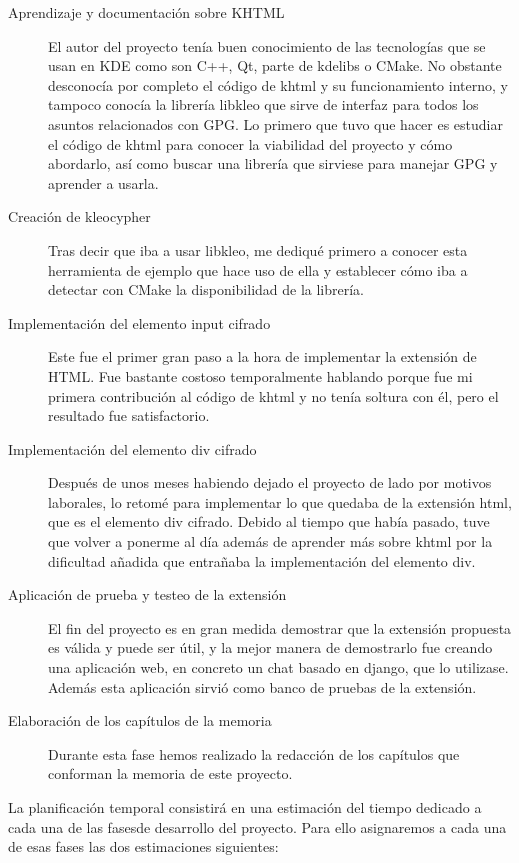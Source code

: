 \begin{description}
 \item[Aprendizaje y documentación sobre KHTML] El autor del proyecto tenía buen conocimiento de las tecnologías que se usan en KDE como son C++, Qt, parte de kdelibs o CMake. No obstante desconocía por completo el código de khtml y su funcionamiento interno, y tampoco conocía la librería libkleo que sirve de interfaz para todos los asuntos relacionados con GPG. Lo primero que tuvo que hacer es estudiar el código de khtml para conocer la viabilidad del proyecto y cómo abordarlo, así como buscar una librería que sirviese para manejar GPG y aprender a usarla.
 \item[Creación de kleocypher] Tras decir que iba a usar libkleo, me dediqué primero a conocer esta herramienta de ejemplo que hace uso de ella y establecer cómo iba a detectar con CMake la disponibilidad de la librería.
 \item[Implementación del elemento input cifrado] Este fue el primer gran paso a la hora de implementar la extensión de HTML. Fue bastante costoso temporalmente hablando porque fue mi primera contribución al código de khtml y no tenía soltura con él, pero el resultado fue satisfactorio.
 \item[Implementación del elemento div cifrado] Después de unos meses habiendo dejado el proyecto de lado por motivos laborales, lo retomé para implementar lo que quedaba de la extensión html, que es el elemento div cifrado. Debido al tiempo que había pasado, tuve que volver a ponerme al día además de aprender más sobre khtml por la dificultad añadida que entrañaba la implementación del elemento div.
 \item[Aplicación de prueba y testeo de la extensión] El fin del proyecto es en gran medida demostrar que la extensión propuesta es válida y puede ser útil, y la mejor manera de demostrarlo fue creando una aplicación web, en concreto un chat basado en django, que lo utilizase. Además esta aplicación sirvió como banco de pruebas de la extensión.
 \item[Elaboración de los capítulos de la memoria] Durante esta fase hemos realizado la redacción de los capítulos que conforman la memoria de este proyecto.
 \end{description}

La planificación temporal consistirá en una estimación del tiempo dedicado a cada una de las fasesde desarrollo del proyecto. Para ello asignaremos a cada una de esas fases las dos estimaciones siguientes:
    
